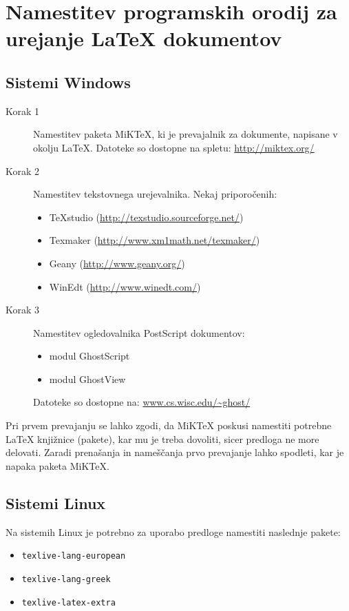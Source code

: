 \chapter{Namestitev programskih orodij za urejanje LaTeX dokumentov} \label{prilogaC}

\section{Sistemi Windows}

\begin{description}
	\item[Korak 1] Namestitev paketa MiKTeX, ki je prevajalnik za dokumente, napisane v okolju LaTeX. Datoteke so dostopne na spletu: \url{http://miktex.org/}
	\item[Korak 2] Namestitev tekstovnega urejevalnika. Nekaj priporočenih:
	\begin{itemize}[noitemsep]
		\item TeXstudio (\url{http://texstudio.sourceforge.net/})
		\item Texmaker (\url{http://www.xm1math.net/texmaker/})
		\item Geany (\url{http://www.geany.org/})
		\item WinEdt (\url{http://www.winedt.com/})
	\end{itemize}
	\item[Korak 3] Namestitev ogledovalnika PostScript dokumentov:
	\begin{itemize}[noitemsep]
		\item modul GhostScript
		\item modul GhostView
	\end{itemize}
	Datoteke so dostopne na: \url{www.cs.wisc.edu/~ghost/}
\end{description}

Pri prvem prevajanju se lahko zgodi, da MiKTeX poskusi namestiti potrebne LaTeX knjižnice (pakete), kar mu je treba dovoliti, sicer predloga ne more delovati. Zaradi prenašanja in nameščanja prvo prevajanje lahko spodleti, kar je napaka paketa MiKTeX.

\section{Sistemi Linux}

Na sistemih Linux je potrebno za uporabo predloge namestiti naslednje pakete:

\begin{itemize}[noitemsep]
	\item \texttt{texlive-lang-european}
	\item \texttt{texlive-lang-greek}
	\item \texttt{texlive-latex-extra}
\end{itemize}

